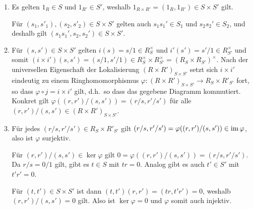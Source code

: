 \begin{solution}
  \begin{enumerate}
    \item
      Es gelten $1_R \in S$ und $1_{R'} \in S'$, weshalb $1_{R \times R'} = (1_R, 1_{R'}) \in S \times S'$ gilt.
      
      Für $(s_1, s'_1), (s_2, s'_2) \in S \times S'$ gelten auch $s_1 s_1' \in S_1$ und $s_2 s_2' \in S_2$, und deshalb gilt $(s_1 s_1', s_2, s_2') \in S \times S'$.
      
    \item
      Für $(s, s') \in S \times S'$ gelten $i(s) = s/1 \in R_S^\times$ und $i'(s') = s'/1 \in R_{S'}^\times$ und somit $(i \times i')(s,s') = (s/1, s'/1) \in R_S^\times \times R_{S'}^\times = (R_S \times R_{S'})^\times$.
      Nach der universellen Eigenschaft der Lokalisierung $(R \times R')_{S \times S'}$ setzt sich $i \times i'$ eindeutig zu einem Ringhomomorphismus $\varphi \colon (R \times R')_{S \times S'} \to R_S \times R'_{S'}$ fort, so dass $\varphi \circ j = i \times i'$ gilt, d.h.\ so dass das gegebene Diagramm kommutiert.
      Konkret gilt $\varphi((r,r')/(s,s')) = (r/s, r'/s')$ für alle $(r,r')/(s,s') \in (R \times R')_{S \times S'}$.
      
    \item
      Für jedes $(r/s, r'/s') \in R_S \times R'_{S'}$ gilt $(r/s, r'/s') = \varphi((r,r')/(s,s')) \in \operatorname{im} \varphi$, also ist $\varphi$ surjektiv.
      
      Für $(r,r')/(s,s') \in \ker \varphi$ gilt $0 = \varphi((r,r')/(s,s')) = (r/s, r'/s')$.
      Da $r/s = 0/1$ gilt, gibt es $t \in S$ mit $tr = 0$.
      Analog gibt es auch $t' \in S'$ mit $t'r' = 0$.
      
      Für $(t,t') \in S \times S'$ ist dann $(t,t')(r,r') = (tr,t'r') = 0$, weshalb $(r,r')/(s,s') = 0$ gilt.
      Also ist $\ker \varphi = 0$ und $\varphi$ somit auch injektiv.
  \end{enumerate}
\end{solution}


